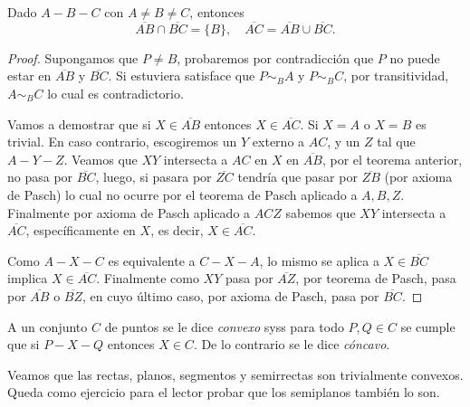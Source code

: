 \documentclass[11pt,a4paper]{book}
\begin{document}
\begin{thm}
Dado $A-B-C$ con $A\neq B\neq C$, entonces
$$\overline{AB}\cap\overline{BC}=\{B\},\quad\overline{AC}=\overline{AB}\cup\overline{BC}.$$
\end{thm}
\begin{proof}
Supongamos que $P\neq B$, probaremos por contradicción que $P$ no puede estar en $\overline{AB}$ y $\overline{BC}$. Si estuviera satisface que $P\sim_B A$ y $P\sim_B C$, por transitividad, $A\sim_B C$ lo cual es contradictorio.

Vamos a demostrar que si $X\in\overline{AB}$ entonces $X\in\overline{AC}$. Si $X=A$ o $X=B$ es trivial. En caso contrario, escogiremos un $Y$ externo a $AC$, y un $Z$ tal que $A-Y-Z$. Veamos que $XY$ intersecta a $AC$ en $X$ en $\overline{AB}$, por el teorema anterior, no pasa por $\overline{BC}$, luego, si pasara por $\overline{ZC}$ tendría que pasar por $\overline{ZB}$ (por axioma de Pasch) lo cual no ocurre por el teorema de Pasch aplicado a $A,B,Z$. Finalmente por axioma de Pasch aplicado a $ACZ$ sabemos que $XY$ intersecta a $\overline{AC}$, específicamente en $X$, es decir, $X\in\overline{AC}$.
\begin{figure}[!ht]
\centering
{}
\end{figure}

Como $A-X-C$ es equivalente a $C-X-A$, lo mismo se aplica a $X\in\overline{BC}$ implica $X\in\overline{AC}$. Finalmente como $XY$ pasa por $\overline{AZ}$, por teorema de Pasch, pasa por $\overline{AB}$ o $\overline{BZ}$, en cuyo último caso, por axioma de Pasch, pasa por $\overline{BC}$.
\end{proof}
\begin{mydef}
A un conjunto $C$ de puntos se le dice \textit{convexo} syss para todo $P,Q\in C$ se cumple que si $P-X-Q$ entonces $X\in C$. De lo contrario se le dice \textit{cóncavo}.
\end{mydef}
Veamos que las rectas, planos, segmentos y semirrectas son trivialmente convexos. Queda como ejercicio para el lector probar que los semiplanos también lo son.
\end{document}
